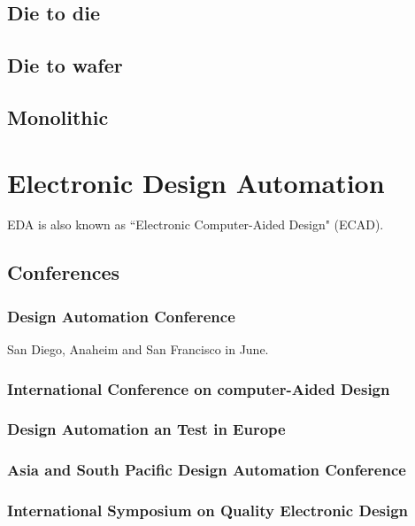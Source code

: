 \documentclass[12pt,a4paper]{article}
\theoremstyle{customdef}
\begin{document}
\subsection{Die to die}

\subsection{Die to wafer}

\subsection{Monolithic}







\section{Electronic Design Automation}
EDA is also known as ``Electronic Computer-Aided Design" (ECAD).

\subsection{Conferences}
\subsubsection{Design Automation Conference}
San Diego, Anaheim and San Francisco in June.
\subsubsection{International Conference on computer-Aided Design}
\subsubsection{Design Automation an Test in Europe}
\subsubsection{Asia and South Pacific Design Automation Conference}
\subsubsection{International Symposium on Quality Electronic Design}
\end{document}
